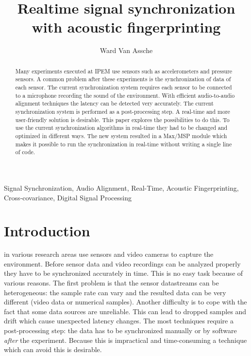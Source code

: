 \documentclass[twocolumn]{phdsymp} %
\begin{document}
\title{Realtime signal synchronization with acoustic fingerprinting} %

\author{Ward Van Assche}


\maketitle

\begin{abstract}
Many experiments executed at IPEM use sensors such as accelerometers and pressure sensors. A common problem after these experiments is the synchronization of data of each sensor. The current synchronization system requires each sensor to be connected to a microphone recording the sound of the environment. With efficient audio-to-audio alignment techniques the latency can be detected very accurately. The current synchronization system is performed as a post-processing step. A real-time and more user-friendly solution is desirable. This paper explores the possibilities to do this. To use the current synchronization algorithms in real-time they had to be changed and optimized in different ways. The new system resulted in a Max/MSP module which makes it possible to run the synchronization in real-time without writing a single line of code.
\end{abstract}

\begin{keywords}
Signal Synchronization, Audio Alignment, Real-Time, Acoustic Fingerprinting, Cross-covariance, Digital Signal Processing
\end{keywords}

\section{Introduction}


 in various research areas use sensors and video cameras to capture the environment.  Before sensor data and video recordings can be analyzed properly they have to be synchronized accurately in time. This is no easy task because of various reasons. The first problem is that the sensor datastreams can be heterogeneous: the sample rate can vary and the resulted data can be very different (video data or numerical samples). Another difficulty is to cope with the fact that some data sources are unreliable. This can lead to dropped samples and drift which cause unexpected latency changes. The most techniques require a post-processing step: the data has to be synchronized manually or by software \emph{after} the experiment. Because this is impractical and time-consuming a technique which can avoid this is desirable.
\end{document}
